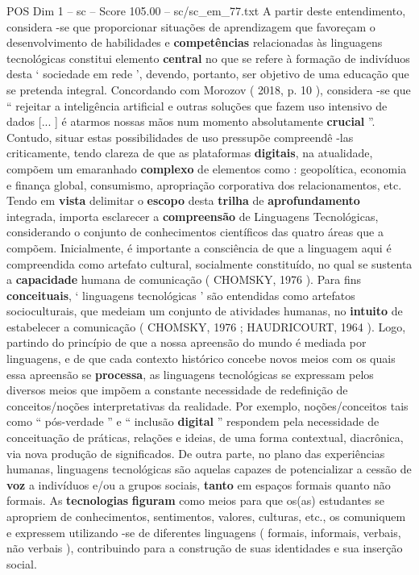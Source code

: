 \begin{textsample}{POS Dim 1 – sc – Score 105.00 – sc/sc\_em\_77.txt}
A partir deste entendimento, considera -se que proporcionar situações de aprendizagem que favoreçam o desenvolvimento de habilidades e \textbf{competências} relacionadas às linguagens tecnológicas constitui elemento \textbf{central} no que se refere à formação de indivíduos desta ‘ sociedade em rede ’, devendo, portanto, ser objetivo de uma educação que se pretenda integral.
Concordando com Morozov ( 2018, p. 10 ), considera -se que “ rejeitar a inteligência artificial e outras soluções que fazem uso intensivo de dados [... ] é atarmos nossas mãos num momento absolutamente \textbf{crucial} ”.
Contudo, situar estas possibilidades de uso pressupõe compreendê -las criticamente, tendo clareza de que as plataformas \textbf{digitais}, na atualidade, compõem um emaranhado \textbf{complexo} de elementos como : geopolítica, economia e finança global, consumismo, apropriação corporativa dos relacionamentos, etc.
Tendo em \textbf{vista} delimitar o \textbf{escopo} desta \textbf{trilha} de \textbf{aprofundamento} integrada, importa esclarecer a \textbf{compreensão} de Linguagens Tecnológicas, considerando o conjunto de conhecimentos científicos das quatro áreas que a compõem.
Inicialmente, é importante a consciência de que a linguagem aqui é compreendida como artefato cultural, socialmente constituído, no qual se sustenta a \textbf{capacidade} humana de comunicação ( CHOMSKY, 1976 ).
Para fins \textbf{conceituais}, ‘ linguagens tecnológicas ’ são entendidas como artefatos socioculturais, que medeiam um conjunto de atividades humanas, no \textbf{intuito} de estabelecer a comunicação ( CHOMSKY, 1976 ; HAUDRICOURT, 1964 ).
Logo, partindo do princípio de que a nossa apreensão do mundo é mediada por linguagens, e de que cada contexto histórico concebe novos meios com os quais essa apreensão se \textbf{processa}, as linguagens tecnológicas se expressam pelos diversos meios que impõem a constante necessidade de redefinição de conceitos/noções interpretativas da realidade.
Por exemplo, noções/conceitos tais como “ pós-verdade ” e “ inclusão \textbf{digital} ” respondem pela necessidade de conceituação de práticas, relações e ideias, de uma forma contextual, diacrônica, via nova produção de significados.
De outra parte, no plano das experiências humanas, linguagens tecnológicas são aquelas capazes de potencializar a cessão de \textbf{voz} a indivíduos e/ou a grupos sociais, \textbf{tanto} em espaços formais quanto não formais.
As \textbf{tecnologias} \textbf{figuram} como meios para que os(as) estudantes se apropriem de conhecimentos, sentimentos, valores, culturas, etc., os comuniquem e expressem utilizando -se de diferentes linguagens ( formais, informais, verbais, não verbais ), contribuindo para a construção de suas identidades e sua inserção social.

\end{textsample}
